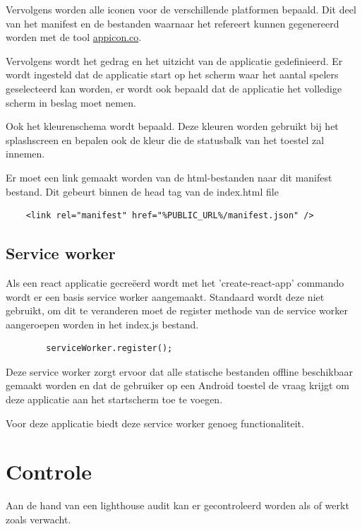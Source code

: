 		
		Vervolgens worden alle iconen voor de verschillende platformen bepaald. Dit deel van het manifest en de bestanden waarnaar het refereert kunnen gegenereerd worden met de tool \href{https://appicon.co}{appicon.co}.
		
		Vervolgens wordt het gedrag en het uitzicht van de applicatie gedefinieerd. Er wordt ingesteld dat de applicatie start op het scherm waar het aantal spelers geselecteerd kan worden, er wordt ook bepaald dat de applicatie het volledige scherm in beslag moet nemen.
		
		Ook het kleurenschema wordt bepaald. Deze kleuren worden gebruikt bij het splashscreen en bepalen ook de kleur die de statusbalk van het toestel zal innemen. 
		
		Er moet een link gemaakt worden van de html-bestanden naar dit manifest bestand. Dit gebeurt binnen de head tag van de index.html file
		
\begin{lstlisting}
	<link rel="manifest" href="%PUBLIC_URL%/manifest.json" />
\end{lstlisting}
		
		
	\subsection{Service worker}
		
		Als een react applicatie gecreëerd wordt met het 'create-react-app' commando wordt er  een basis service worker aangemaakt. Standaard wordt deze niet gebruikt, om dit te veranderen moet de register methode van de service worker aangeroepen worden in het index.js bestand.
		
\begin{lstlisting}
		serviceWorker.register();
\end{lstlisting}
		
		Deze service worker zorgt ervoor dat alle statische bestanden offline beschikbaar gemaakt worden en dat de gebruiker op een Android toestel de vraag krijgt om deze applicatie aan het startscherm toe te voegen.
		
		Voor deze applicatie biedt deze service worker genoeg functionaliteit.
		

\section{Controle}

	Aan de hand van een lighthouse audit kan er gecontroleerd worden als of werkt zoals verwacht.
	
